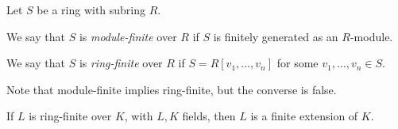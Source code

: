 \documentclass[12pt]{article}
\begin{document}
Let $S$ be a ring with subring $R$.

We say that $S$ is {\em module-finite} over $R$ if $S$ is finitely generated as an $R$-module.

We say that $S$ is {\em ring-finite} over $R$ if $S=R[v_1,\ldots,v_n]$ for some $v_1,\ldots,v_n \in S$.

Note that module-finite implies ring-finite, but the converse is false.

If $L$ is ring-finite over $K$, with $L,K$ fields, then $L$ is a finite extension of $K$.
\end{document}
